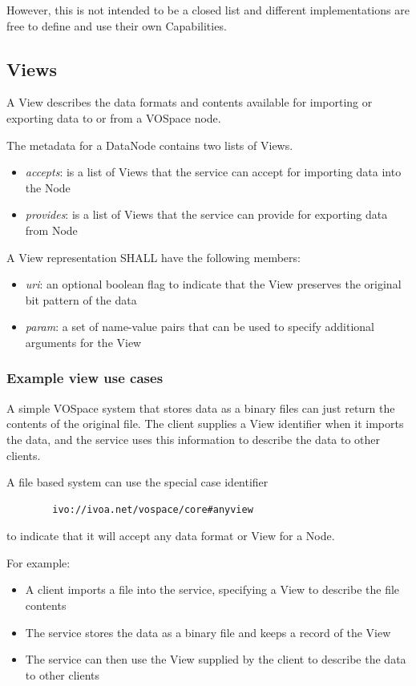 \documentclass[11pt,a4paper]{ivoa}
\begin{document}
However, this is not intended to be a closed list and different implementations are free to define and use their own Capabilities.

\subsection{Views}
\label{subsec:views}
A View describes the data formats and contents available for importing or exporting data to or from a VOSpace node.

The metadata for a DataNode contains two lists of Views.

\begin{itemize}
    \item \emph{accepts}: is a list of Views that the service can accept for importing data into the Node
    \item \emph{provides}: is a list of Views that the service can provide for exporting data from Node
\end{itemize}

A View representation SHALL have the following members:

\begin{itemize}
    \item \emph{uri}: an optional boolean flag to indicate that the View preserves the original bit pattern of the data
    \item \emph{param}: a set of name-value pairs that can be used to specify additional arguments for the View
\end{itemize}

\subsubsection{Example view use cases}
\label{subsubsec:example view use cases}
A simple VOSpace system that stores data as a binary files can just return the contents of the original file. The client supplies a View identifier when it imports the data, and the service uses this information to describe the data to other clients.

A file based system can use the special case identifier
\begin{verbatim}
        ivo://ivoa.net/vospace/core#anyview
\end{verbatim}
to indicate that it will accept any data format or View for a Node.

For example:

\begin{itemize}
    \item A client imports a file into the service, specifying a View to describe the file contents
    \item The service stores the data as a binary file and keeps a record of the View
    \item The service can then use the View supplied by the client to describe the data to other clients
\end{itemize}
\end{document}
